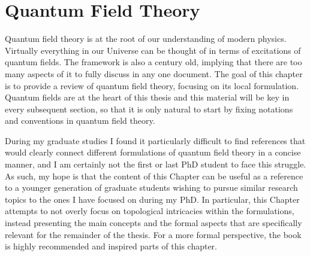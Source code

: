 \documentclass[letterpaper,12pt,titlepage,oneside,final]{book}
\newcommand{\trr}[1]{\textcolor{red}{#1}}
\begin{document}









%

\chapter{Quantum Field Theory}\label{chap:QFT}

Quantum field theory is at the root of our understanding of modern physics. Virtually everything in our Universe can be thought of in terms of excitations of quantum fields. The framework is also a century old, implying that there are too many aspects of it to fully discuss in any one document. The goal of this chapter is to provide a review of quantum field theory, focusing on its local formulation. Quantum fields are at the heart of this thesis and this material will be key in every subsequent section, so that it is only natural to start by fixing notations and conventions in quantum field theory. 


During my graduate studies I found it particularly difficult to find references that would clearly connect different formulations of quantum field theory in a concise manner, and I am certainly not the first or last PhD student to face this struggle. As such, my hope is that the content of this Chapter can be useful as a reference to a younger generation of graduate students wishing to pursue similar research topics to the ones I have focused on during my PhD. In particular, this Chapter attempts to not overly focus on topological intricacies within the formulations, instead presenting the main concepts and the formal aspects that are specifically relevant for the remainder of the thesis. For a more formal perspective, the book~\cite{TheBook} is highly recommended and inspired parts of this chapter.
\end{document}
